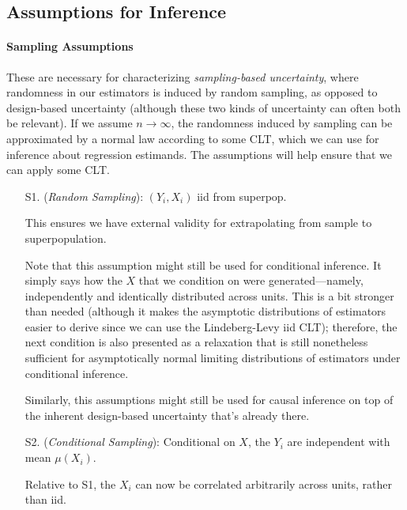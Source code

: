 \documentclass[12pt]{article}
\theoremstyle{plain}
\theoremstyle{definition}
\theoremstyle{remark}
\newcommand{\ra}{\rightarrow}
\begin{document}
\clearpage
\subsection{Assumptions for Inference}

\paragraph{Sampling Assumptions}
These are necessary for characterizing
\emph{sampling-based uncertainty}, where randomness in our estimators is
induced by random sampling, as opposed to design-based uncertainty
(although these two kinds of uncertainty can often both be relevant).
If we assume $n\ra\infty$, the randomness induced by sampling can be
approximated by a normal law according to some CLT, which we can use for
inference about regression estimands.
The assumptions will help ensure that we can apply some CLT.
\begin{enumerate}[label=(\roman*)]
  \item[S1.]
    (\emph{Random Sampling}):
    $(Y_i,X_i)$ iid from superpop.

    This ensures we have external validity for extrapolating from sample
    to superpopulation.

    Note that this assumption might still be used for
    conditional inference.
    It simply says how the $X$ that we condition on were
    generated---namely, independently and identically distributed across
    units.
    This is a bit stronger than needed (although it makes the
    asymptotic distributions of estimators easier to derive since we can
    use the Lindeberg-Levy iid CLT); therefore, the next condition is
    also presented as a relaxation that is still nonetheless sufficient
    for asymptotically normal limiting distributions of estimators under
    conditional inference.

    Similarly, this assumptions might still be used for causal
    inference on top of the inherent design-based uncertainty that's
    already there.

  \item[S2.]
    (\emph{Conditional Sampling}):
    Conditional on $X$, the $Y_i$ are independent with
    mean $\mu(X_i)$.

    Relative to S1, the $X_i$ can now be correlated arbitrarily across
    units, rather than iid.

\end{enumerate}
\end{document}
